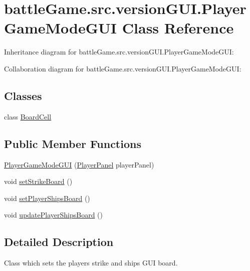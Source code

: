 \hypertarget{classbattleGame_1_1src_1_1versionGUI_1_1PlayerGameModeGUI}{}\section{battle\+Game.\+src.\+version\+G\+U\+I.\+Player\+Game\+Mode\+G\+UI Class Reference}
\label{classbattleGame_1_1src_1_1versionGUI_1_1PlayerGameModeGUI}


Inheritance diagram for battle\+Game.\+src.\+version\+G\+U\+I.\+Player\+Game\+Mode\+G\+UI\+:


Collaboration diagram for battle\+Game.\+src.\+version\+G\+U\+I.\+Player\+Game\+Mode\+G\+UI\+:
\subsection*{Classes}
\begin{DoxyCompactItemize}
\item 
class \hyperlink{classbattleGame_1_1src_1_1versionGUI_1_1PlayerGameModeGUI_1_1BoardCell}{Board\+Cell}
\end{DoxyCompactItemize}
\subsection*{Public Member Functions}
\begin{DoxyCompactItemize}
\item 
\hyperlink{classbattleGame_1_1src_1_1versionGUI_1_1PlayerGameModeGUI_a788f6477d1e232b2c241d59f1df9effa}{Player\+Game\+Mode\+G\+UI} (\hyperlink{classbattleGame_1_1src_1_1versionGUI_1_1PlayerPanel}{Player\+Panel} player\+Panel)
\item 
void \hyperlink{classbattleGame_1_1src_1_1versionGUI_1_1PlayerGameModeGUI_a0b95593b73c2d204f5fd207d435b8754}{set\+Strike\+Board} ()
\item 
void \hyperlink{classbattleGame_1_1src_1_1versionGUI_1_1PlayerGameModeGUI_a92441d2d8aa686a26efd7e94e3ea08f1}{set\+Player\+Ships\+Board} ()
\item 
void \hyperlink{classbattleGame_1_1src_1_1versionGUI_1_1PlayerGameModeGUI_ac609e618c7fa8d7432edaaa407c063c2}{update\+Player\+Ships\+Board} ()
\end{DoxyCompactItemize}


\subsection{Detailed Description}
Class which sets the player\textquotesingle{}s strike and ships G\+UI board. 

